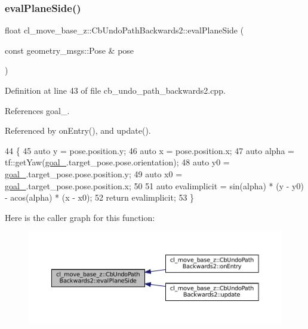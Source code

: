 \subsubsection{\texorpdfstring{eval\+Plane\+Side()}{evalPlaneSide()}}
{\footnotesize\ttfamily float cl\+\_\+move\+\_\+base\+\_\+z\+::\+Cb\+Undo\+Path\+Backwards2\+::eval\+Plane\+Side (\begin{DoxyParamCaption}\item[{const geometry\+\_\+msgs\+::\+Pose \&}]{pose }\end{DoxyParamCaption})\hspace{0.3cm}{\ttfamily [private]}}



Definition at line 43 of file cb\+\_\+undo\+\_\+path\+\_\+backwards2.\+cpp.



References goal\+\_\+.



Referenced by on\+Entry(), and update().


\begin{DoxyCode}
44 \{
45   \textcolor{keyword}{auto} y = pose.position.y;
46   \textcolor{keyword}{auto} x = pose.position.x;
47   \textcolor{keyword}{auto} alpha = tf::getYaw(\hyperlink{classcl__move__base__z_1_1CbUndoPathBackwards2_ad119c38ee9cb341c9b468682d1794538}{goal\_}.target\_pose.pose.orientation);
48   \textcolor{keyword}{auto} y0 = \hyperlink{classcl__move__base__z_1_1CbUndoPathBackwards2_ad119c38ee9cb341c9b468682d1794538}{goal\_}.target\_pose.pose.position.y;
49   \textcolor{keyword}{auto} x0 = \hyperlink{classcl__move__base__z_1_1CbUndoPathBackwards2_ad119c38ee9cb341c9b468682d1794538}{goal\_}.target\_pose.pose.position.x;
50 
51   \textcolor{keyword}{auto} evalimplicit = sin(alpha) * (y - y0) - acos(alpha) * (x - x0);
52   \textcolor{keywordflow}{return} evalimplicit;
53 \}
\end{DoxyCode}
Here is the caller graph for this function\+:
\nopagebreak
\begin{figure}[H]
\begin{center}
\leavevmode
\includegraphics[width=350pt]{classcl__move__base__z_1_1CbUndoPathBackwards2_a20b9a6799b0484810b0319f5a97d020e_icgraph}
\end{center}
\end{figure}
\mbox{\label{classcl__move__base__z_1_1CbUndoPathBackwards2_a1b96187df9be6ce0fbdb5511147685d3}} 
